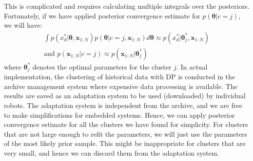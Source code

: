 \documentclass[journal]{IEEEtran}
\begin{document}
This is complicated and requires calculating multiple integrals over the posteriors. 
Fortunately, if we have applied posterior convergence estimate for $p(\bm{\theta}|c=j)$, we will have:
\begin{equation}
\begin{gathered}
\int p(x^*_d|\bm{\theta}, \bm{x}_{1:N})p(\bm{\theta}|c=j, \bm{x}_{1:N}) d\bm{\theta} \approx p(x^*_d|\bm{\theta}^*_j, \bm{x}_{1:N})
\\
\text{and } p(\bm{x}_{1:N}|c=j) \approx p(\bm{x}_{1:N}|\bm{\theta}^*_j)
\end{gathered}
\label{posterior_convergence_simplification}
\end{equation}
where $\bm{\theta}^*_j$ denotes the optimal parameters for the cluster $j$.
In actual implementation, the clustering of historical data with DP is conducted in the archive management system where expensive data processing is available. 
The results are saved as an adaptation system to be used (downloaded) by individual robots.
The adaptation system is independent from the archive, and we are free to make simplifications for embedded systems.
Hence, we can apply posterior convergence estimate for all the clusters we have found for simplicity.
For clusters that are not large enough to refit the parameters, we will just use the parameters of the most likely prior sample.
This might be inappropriate for clusters that are very small, and hence we can discard them from the adaptation system.
\end{document}
